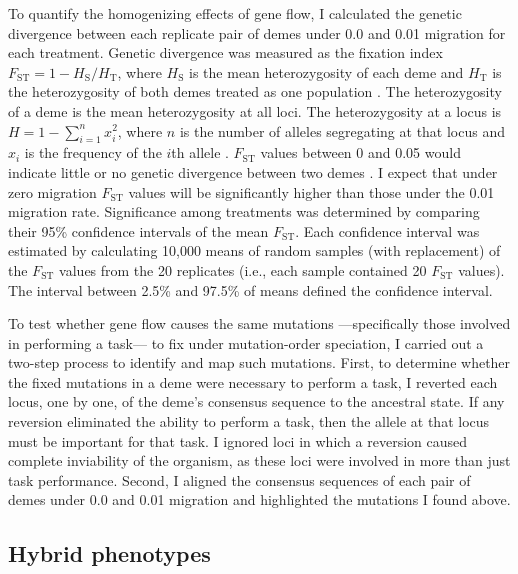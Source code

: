 \begin{doublespace}
To quantify the homogenizing effects of gene flow,
I calculated the genetic divergence
between each replicate pair of demes
under 0.0 and 0.01 migration for each treatment.
%
Genetic divergence was measured as the fixation index
$F_{\mathrm{ST}} = 1 - H_{\mathrm{S}} / H_{\mathrm{T}}$,
where $H_{\mathrm{S}}$ is the mean heterozygosity of each deme
and $H_{\mathrm{T}}$ is the heterozygosity of both demes
treated as one population \citep[p. 118]{har97}.
%
The heterozygosity of a deme
is the mean heterozygosity at all loci.
%
The heterozygosity at a locus is $H = 1 - \sum_{i = 1}^{n} x_i^{2}$,
where $n$ is the number of alleles segregating at that locus
and $x_i$ is the frequency of the $i$th allele \citep[p. 15]{gil04}.
%
$F_{\mathrm{ST}}$ values between 0 and 0.05
would indicate little or no genetic divergence
between two demes \citep[p. 118]{har97}.
%
I expect that under zero migration
$F_{\mathrm{ST}}$ values will be significantly higher
than those under the 0.01 migration rate.
%
Significance among treatments was determined by comparing their
95\% confidence intervals of the mean $F_{\mathrm{ST}}$.
%
Each confidence interval was estimated by calculating 10,000 means
of random samples (with replacement) of the $F_{\mathrm{ST}}$ values
from the 20 replicates
(i.e., each sample contained 20 $F_{\mathrm{ST}}$ values).
%
The interval between 2.5\% and 97.5\% of means defined the confidence interval.



To test whether gene flow causes the same mutations%
---specifically those involved in performing a task---%
to fix under mutation-order speciation,
I carried out a two-step process to identify and map such mutations.
%
First, to determine whether the fixed mutations in a deme
were necessary to perform a task,
I reverted each locus, one by one, of the deme's consensus sequence
to the ancestral state.
%
If any reversion eliminated the ability to perform a task,
then the allele at that locus must be important for that task.
%
I ignored loci in which a reversion caused
complete inviability of the organism,
as these loci were involved in more than just task performance.
%
Second, I aligned the consensus sequences of each pair of demes
under 0.0 and 0.01 migration and highlighted the mutations I found above.



\subsection{Hybrid phenotypes}


\end{doublespace}
